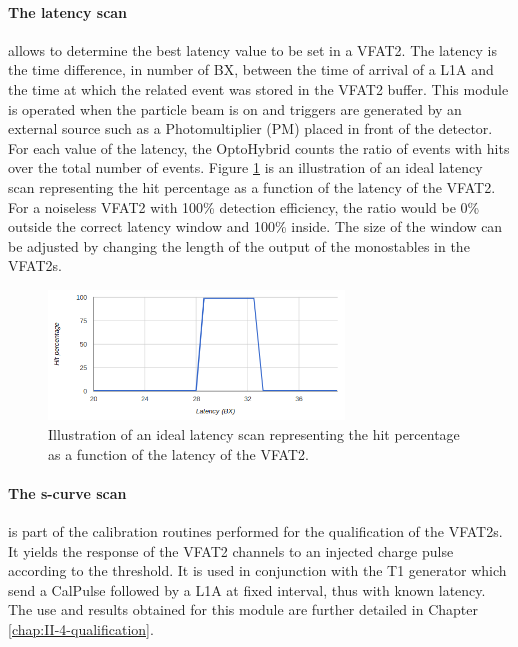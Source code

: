       \paragraph{The latency scan} allows to determine the best latency value to be set in a VFAT2. The latency is the time difference, in number of BX, between the time of arrival of a L1A and the time at which the related event was stored in the VFAT2 buffer. This module is operated when the particle beam is on and triggers are generated by an external source such as a Photomultiplier (PM) placed in front of the detector. For each value of the latency, the OptoHybrid counts the ratio of events with hits over the total number of events. Figure \ref{fig:II-3-latency-scan} is an illustration of an ideal latency scan representing the hit percentage as a function of the latency of the VFAT2. For a noiseless VFAT2 with 100\% detection efficiency, the ratio would be 0\% outside the correct latency window and 100\% inside. The size of the window can be adjusted by changing the length of the output of the monostables in the VFAT2s.

      \begin{figure}[h!]
        \centering
        \includegraphics[width=0.7\textwidth]{img/II-3-test-beam/latency_scan.png}
        \caption{Illustration of an ideal latency scan representing the hit percentage as a function of the latency of the VFAT2.}
        \label{fig:II-3-latency-scan}
      \end{figure}

      \paragraph{The s-curve scan} is part of the calibration routines performed for the qualification of the VFAT2s. It yields the response of the VFAT2 channels to an injected charge pulse according to the threshold. It is used in conjunction with the T1 generator which send a CalPulse followed by a L1A at fixed interval, thus with known latency. The use and results obtained for this module are further detailed in Chapter \ref{chap:II-4-qualification}.

